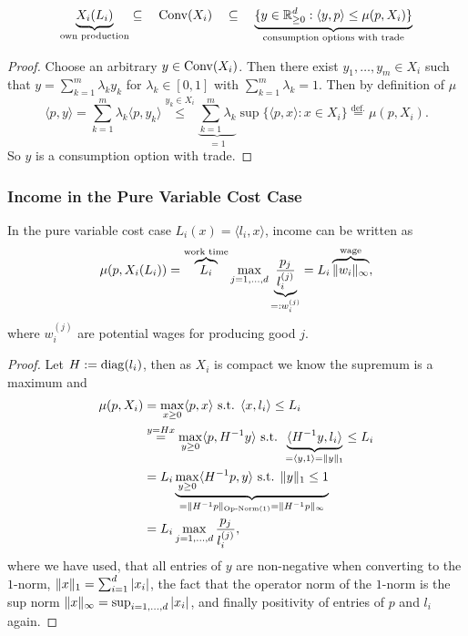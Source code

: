 \begin{lemma}
\[
	\underbrace{X_i(L_i)}_{\text{own production}}
	\subseteq \quad \operatorname{Conv}(X_i)\quad
	\subseteq \quad
	\underbrace{
		\{y\in\mathbb{R}_{\ge 0}^d: \langle y, p\rangle \le \mu(p, X_i)\}
	}_{\text{consumption options with trade}}
\]
\end{lemma}
\begin{proof}
	Choose an arbitrary \(y\in \operatorname{Conv}(X_i)\). Then there exist \(y_1,\dots, y_m\in X_i\)
	such that \(y=\sum_{k=1}^m \lambda_k y_k\) for \(\lambda_k\in[0,1]\) with
	\(\sum_{k=1}^{m}\lambda_k=1\). Then by definition of \(\mu\)
	\[
		\langle p, y\rangle
		= \sum_{k=1}^m \lambda_k\langle p, y_k\rangle
		\overset{y_k\in X_i}\le \underbrace{\sum_{k=1}^m \lambda_k}_{=1}
		\sup\{\langle p, x\rangle : x\in X_i\}
		\overset{\text{def.}}= \mu(p, X_i).
	\]
	So \(y\) is a consumption option with trade.
\end{proof}

\subsubsection{Income in the Pure Variable Cost Case}

\begin{lemma}
	In the pure variable cost case \(L_i(x) = \langle l_i, x\rangle\), income
	can be written as
	\[
		\mu(p, X_i(L_i))
		= \overbrace{L_i}^{\text{work time}} \max_{j=1,\dots,d}
		\underbrace{\frac{p_j}{l_i^{(j)}}}_{=: w_i^{(j)}}
		= L_i \overbrace{\|w_i\|_\infty}^{\text{wage}},
	\]
	where \(w_i^{(j)}\) are potential wages for producing good \(j\).
\end{lemma}
\begin{proof}
	Let \(H:= \operatorname{diag}(l_i)\), then as \(X_i\) is compact we know the supremum is
	a maximum and
	\begin{align*}
		\mu(p, X_i)
		&= \max_{x\ge 0} \langle p, x\rangle
		\text{ s.t. } \langle x, l_i\rangle \le L_i\\
		&\overset{y=Hx}= \max_{y\ge 0} \langle p, H^{-1}y\rangle
		\text{ s.t. } \underbrace{\langle H^{-1}y, l_i\rangle}_{
			= \langle y, 1 \rangle = \|y\|_1
		} \le L_i\\
		&= L_i \underbrace{
			\max_{y\ge 0} \langle H^{-1}p, y\rangle \text{ s.t. } \|y\|_1 \le 1
		}_{
			= \|H^{-1} p\|_{\text{Op-Norm(1)}} = \|H^{-1} p \|_\infty
		}\\
		&= L_i \max_{j=1,\dots,d} \frac{p_j}{l_i^{(j)}},
	\end{align*}
	where we have used, that all entries of \(y\) are non-negative when
	converting to the \(1\)-norm, \(\|x\|_1 = \sum_{i=1}^d |x_i|\), the
	fact that the operator norm of the \(1\)-norm is the sup norm
	\(\|x\|_\infty = \sup_{i=1,\dots,d} |x_i|\),
	and finally positivity of entries of \(p\) and \(l_i\) again.
\end{proof}

